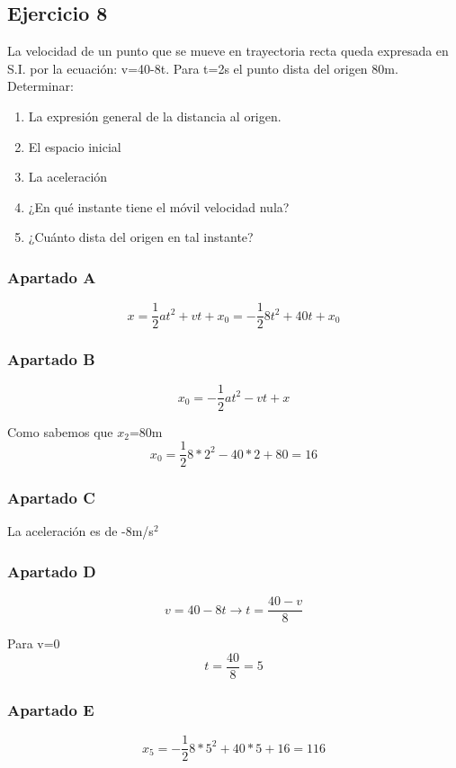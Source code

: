 \subsection{Ejercicio 8}
La velocidad de un punto que se mueve en trayectoria
recta queda expresada en S.I. por la ecuación: v=40-8t.
Para t=2s el punto dista del origen 80m. Determinar:

\begin{enumerate}[label=\Alph*)]
  \item La expresión general de la distancia al origen.
  \item El espacio inicial
  \item La aceleración
  \item ¿En qué instante tiene el móvil velocidad nula?
  \item ¿Cuánto dista del origen en tal instante?
\end{enumerate}

\subsubsection{Apartado A}
  $$
  x = \frac{1}{2}at^2 + vt + x_0
  = -\frac{1}{2}8t^2 + 40t + x_0
  $$

\subsubsection{Apartado B}
  $$
  x_0 = -\frac{1}{2}at^2 - vt + x
  $$
  
  Como sabemos que $x_2$=80m
  $$
  x_0 = \frac{1}{2}8*2^2 - 40*2 + 80 = 16
  $$

\subsubsection{Apartado C}
  La aceleración es de -8m/s$^2$

\subsubsection{Apartado D}
  $$
  v = 40 - 8t \rightarrow t = \frac{40-v}{8}
  $$

  Para v=0
  $$
  t = \frac{40}{8} = 5
  $$

\subsubsection{Apartado E}
  $$
  x_5 = -\frac{1}{2}8*5^2 + 40*5 +16 = 116
  $$